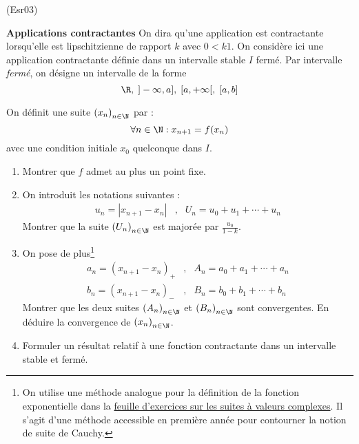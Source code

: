 \begin{tiny}(Esr03)\end{tiny}
\textbf{Applications contractantes}\newline
On dira qu'une application est contractante lorsqu'elle est lipschitzienne de rapport $k$ avec $0<k1$. On considère ici une application contractante définie dans un intervalle stable $I$ fermé.\newline
Par intervalle \emph{fermé}, on désigne un intervalle de la forme
\begin{displaymath}
 \R,\; ]-\infty,a],\; [a,+\infty[,\; [a,b]
\end{displaymath}

On définit une suite $\left( x_n\right) _{n\in \N}$ par :
\begin{displaymath}
 \forall n\in \N: x_{n+1}=f(x_n)
\end{displaymath}
avec une condition initiale $x_0$ quelconque dans $I$.
\begin{enumerate}
 \item Montrer que $f$ admet au plus un point fixe.
 \item  On introduit les notations suivantes :
\begin{align*}
 u_n = |x_{n+1}-x_n|&,& U_n=u_0+u_1+\cdots+u_n
\end{align*}
Montrer que la suite $\left(U_n\right) _{n\in \N}$ est majorée par $\frac{u_0}{1-k}$.
\item On pose de plus\footnote{On utilise une méthode analogue pour la définition de la fonction exponentielle dans la \href{http://back.maquisdoc.net/data/temptex/fexvc.pdf}{feuille d'exercices sur les suites à valeurs complexes}. Il s'agit d'une méthode accessible en première année pour contourner la notion de suite de Cauchy.}
\begin{align*}
 a_n = (x_{n+1}-x_n)_{+}&,& A_n=a_0+a_1+\cdots+a_n \\
 b_n = (x_{n+1}-x_n)_{-}&,& B_n=b_0+b_1+\cdots+b_n 
\end{align*}
Montrer que les deux suites $\left(A_n\right) _{n\in \N}$ et $\left(B_n\right) _{n\in \N}$ sont convergentes. En déduire la convergence de $\left(x_n\right) _{n\in \N}$.
\item Formuler un résultat relatif à une fonction contractante dans un intervalle stable et fermé.
\end{enumerate}

